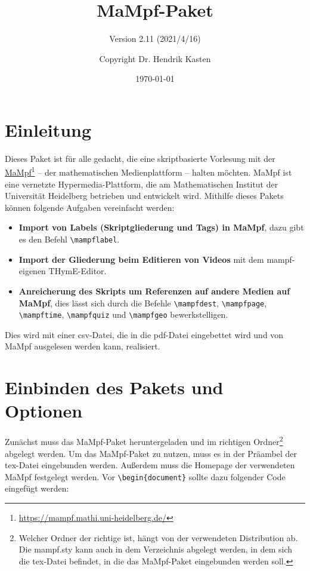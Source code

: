 \documentclass[parskip=off,index=totocnumbered]{scrartcl}
\title{MaMpf-Paket}
\subtitle{Version 2.11 (2021/4/16)}
\author{Copyright Dr. Hendrik Kasten}
\date{\today}
\begin{document}
\vspace{-1cm}
\maketitle
\vspace{-1cm}
\tableofcontents


\section{Einleitung}
Dieses Paket ist für alle gedacht, die eine skriptbasierte Vorlesung mit der \href{https://mampf.mathi.uni-heidelberg.de/}{MaMpf}\footnote{\url{https://mampf.mathi.uni-heidelberg.de/}} -- der mathematischen Medienplattform -- halten möchten. MaMpf ist eine vernetzte Hypermedia-Plattform, die am Mathematischen Institut der Universität Heidelberg betrieben und entwickelt wird. Mithilfe dieses Pakets können folgende Aufgaben vereinfacht werden:
   \begin{itemize} 
      \item \textsf{\textbf{Import von Labels (Skriptgliederung und Tags) in MaMpf}}, dazu gibt es den Befehl \verb|\mampflabel|.
      \item \textsf{\textbf{Import der Gliederung beim Editieren von Videos}} mit dem mampf-eigenen THymE-Editor.
      \item \textsf{\textbf{Anreicherung des Skripts um Referenzen auf andere Medien auf MaMpf}}, dies lässt sich durch die Befehle \verb|\mampfdest|, \verb|\mampfpage|, \verb|\mampftime|, \verb|\mampfquiz| und \verb|\mampfgeo| bewerkstelligen.
   \end{itemize}
Dies wird mit einer csv-Datei, die in die pdf-Datei eingebettet wird und von MaMpf ausgelesen werden kann, realisiert.
   

\section{Einbinden des Pakets und Optionen}
Zunächst muss das MaMpf-Paket heruntergeladen und im richtigen Ordner\footnote{Welcher Ordner der richtige ist, hängt von der verwendeten Distribution ab. Die mampf.sty kann auch in dem Verzeichnis abgelegt werden, in dem sich die tex-Datei befindet, in die das MaMpf-Paket eingebunden werden soll.} abgelegt werden. Um das MaMpf-Paket zu nutzen, muss es in der Präambel der tex-Datei eingebunden werden. Außerdem muss die Homepage der verwendeten MaMpf festgelegt werden. Vor \verb|\begin{document}| sollte dazu folgender Code eingefügt werden:
\end{document}
